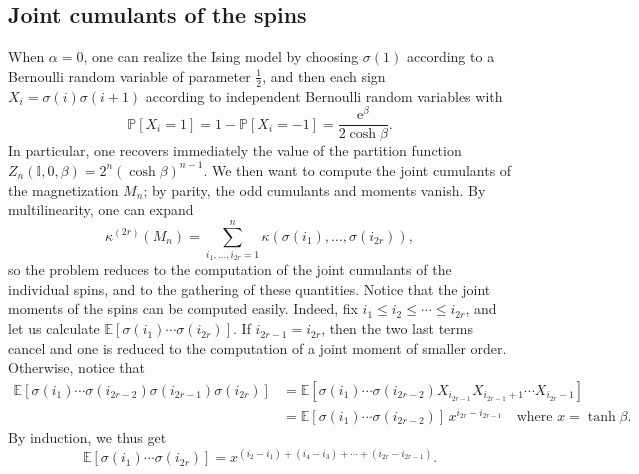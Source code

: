 \documentclass[12pt,a4paper,reqno]{amsart}
\newcommand{\E}{\mathrm{e}}
\newcommand{\esper}{\mathbb{E}}
\newcommand{\proba}{\mathbb{P}}
\newcommand{\IS}{\mathbb{I}}
\theoremstyle{remark}
\begin{document}
\subsection{Joint cumulants of the spins} 
When $\alpha=0$, one can realize the Ising model by choosing $\sigma(1)$ according to a Bernoulli random variable of parameter $\frac{1}{2}$, and then each sign $X_i=\sigma(i)\sigma(i+1)$ according to independent Bernoulli random variables with $$\proba[X_i=1]=1-\proba[X_i=-1]=\frac{\E^{\beta}}{2\cosh \beta}.$$ 
In particular, one recovers immediately the value of the partition function $Z_n(\IS,0,\beta)=2^n(\cosh \beta)^{n-1}$. We then want to compute the joint cumulants of the magnetization $M_n$; by parity, the odd cumulants and moments vanish. By multilinearity, one can expand
$$\kappa^{(2r)}(M_n)=\sum_{i_1,\ldots,i_{2r}=1}^n\kappa(\sigma(i_1),\ldots,\sigma(i_{2r})),$$
so the problem reduces to the computation of the joint cumulants of the individual spins, and to the gathering of these quantities. Notice that the joint moments of the spins can be computed easily. Indeed, fix $i_1\leq i_2 \leq \cdots \leq i_{2r}$, and let us calculate $\esper[\sigma(i_1)\cdots\sigma(i_{2r})]$. If $i_{2r-1}=i_{2r}$, then the two last terms cancel and one is reduced to the computation of a joint moment of smaller order. Otherwise, notice that
\begin{align*}\esper[\sigma(i_1)\cdots\sigma(i_{2r-2})\sigma(i_{2r-1})\sigma(i_{2r})]&=\esper[\sigma(i_1)\cdots\sigma(i_{2r-2})X_{i_{2r-1}}X_{i_{2r-1}+1}\cdots X_{i_{2r}-1}]\\
&=\esper[\sigma(i_1)\cdots\sigma(i_{2r-2})]\,x^{i_{2r}-i_{2r-1}} \quad\text{where }x=\tanh \beta.
\end{align*}
By induction, we thus get
$$\esper[\sigma(i_1)\cdots\sigma(i_{2r})]=x^{(i_2-i_1)+(i_4-i_3)+\cdots+(i_{2r}-i_{2r-1})}.$$\bigskip
\end{document}
